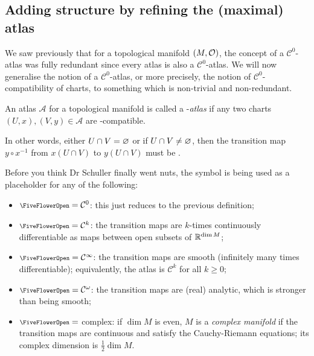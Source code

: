 
\subsection{Adding structure by refining the (maximal) atlas}

We saw previously that for a topological manifold $(M,\mathcal{O})$, the concept of a $\mathcal{C}^0$-atlas was fully redundant since every atlas is also a $\mathcal{C}^0$-atlas. We will now generalise the notion of a $\mathcal{C}^0$-atlas, or more precisely, the notion of $\mathcal{C}^0$-compatibility of charts, to something which is non-trivial and non-redundant.

\begin{definition}
An atlas $\mathscr{A}$ for a topological manifold is called a {\scalebox{0.75}\FiveFlowerOpen}-\emph{atlas} if any two charts $(U,x), (V,y) \in \mathscr{A}$ are {\scalebox{0.75}\FiveFlowerOpen}-compatible.
\end{definition}

In other words, either $U\cap V = \varnothing$ or if $U\cap V \neq \varnothing$, then the transition map $y\circ x^{-1}$ from $x(U\cap V)$ to $y(U\cap V)$ must be {\scalebox{0.75}\FiveFlowerOpen}.
\bse
{}
\ese
Before you think Dr Schuller finally went nuts, the symbol {\scalebox{0.75}\FiveFlowerOpen} is being used as a placeholder for any of the following:
\begin{itemize}
\item ${\scalebox{0.75}\FiveFlowerOpen} = \mathcal{C}^0$: this just reduces to the previous definition;
\item ${\scalebox{0.75}\FiveFlowerOpen} = \mathcal{C}^k$: the transition maps are $k$-times continuously differentiable as maps between open subsets of $\mathbb{R}^{\dim M}$;
\item ${\scalebox{0.75}\FiveFlowerOpen} = \mathcal{C}^\infty$: the transition maps are smooth (infinitely many times differentiable); equivalently, the atlas is $\mathcal{C}^k$ for all $k\geq 0$;
\item ${\scalebox{0.75}\FiveFlowerOpen} = \mathcal{C}^\omega$: the transition maps are (real) analytic, which is stronger than being smooth;
\item ${\scalebox{0.75}\FiveFlowerOpen} =$ complex: if $\dim M$ is even, $M$ is a \emph{complex manifold} if the transition maps are continuous and satisfy the Cauchy-Riemann equations; its complex dimension is $\tfrac{1}{2}\dim M$.
\end{itemize}


